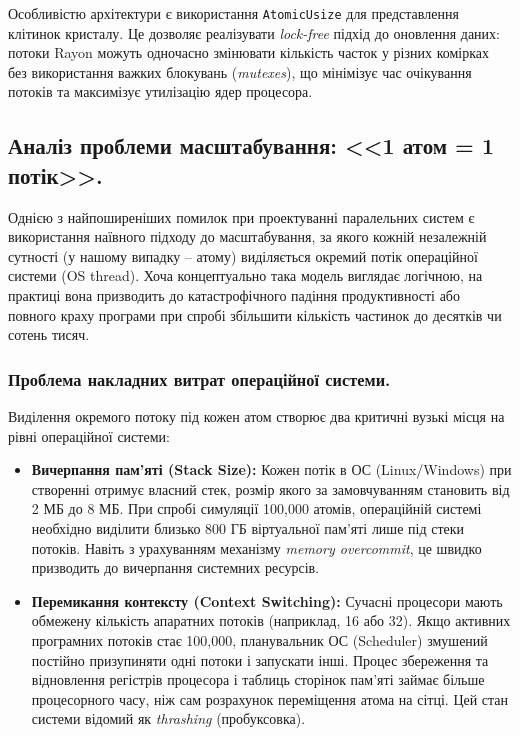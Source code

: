 \documentclass[14pt, a4paper]{extreport}
\begin{document}
	Особливістю архітектури є використання \texttt{AtomicUsize} для представлення клітинок кристалу. Це дозволяє реалізувати \textit{lock-free} підхід до оновлення даних: потоки Rayon можуть одночасно змінювати кількість часток у різних комірках без використання важких блокувань (\textit{mutexes}), що мінімізує час очікування потоків та максимізує утилізацію ядер процесора.
	
	
	\subsection{Аналіз проблеми масштабування: <<1 атом = 1 потік>>.}
	
	Однією з найпоширеніших помилок при проектуванні паралельних систем є використання наївного підходу до масштабування, за якого кожній незалежній сутності (у нашому випадку -- атому) виділяється окремий потік операційної системи (OS thread). Хоча концептуально така модель виглядає логічною, на практиці вона призводить до катастрофічного падіння продуктивності або повного краху програми при спробі збільшити кількість частинок до десятків чи сотень тисяч.
	
	\subsubsection{Проблема накладних витрат операційної системи.}
	
	Виділення окремого потоку під кожен атом створює два критичні вузькі місця на рівні операційної системи:
	
	\begin{itemize}
		\item \textbf{Вичерпання пам'яті (Stack Size):} Кожен потік в ОС (Linux/Windows) при створенні отримує власний стек, розмір якого за замовчуванням становить від 2 МБ до 8 МБ. При спробі симуляції 100,000 атомів, операційній системі необхідно виділити близько 800 ГБ віртуальної пам'яті лише під стеки потоків. Навіть з урахуванням механізму \textit{memory overcommit}, це швидко призводить до вичерпання системних ресурсів.
		\item \textbf{Перемикання контексту (Context Switching):} Сучасні процесори мають обмежену кількість апаратних потоків (наприклад, 16 або 32). Якщо активних програмних потоків стає 100,000, планувальник ОС (Scheduler) змушений постійно призупиняти одні потоки і запускати інші. Процес збереження та відновлення регістрів процесора і таблиць сторінок пам'яті займає більше процесорного часу, ніж сам розрахунок переміщення атома на сітці. Цей стан системи відомий як \textit{thrashing} (пробуксовка).
	\end{itemize}
	
\end{document}
